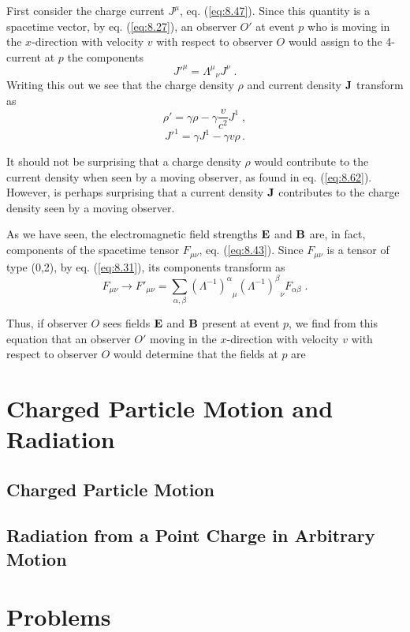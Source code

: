 First consider the charge current $J^\mu$, eq. (\ref{eq:8.47}). Since this quantity is a spacetime vector, by  eq. (\ref{eq:8.27}), an observer $O'$ at event $p$ who is moving in the $x$-direction with velocity $v$ with respect to observer $O$ would assign to the 4-current at $p$ the components
\begin{equation}\label{eq:8.60}
{J'}^\mu = {\Lambda^\mu}_\nu J^\nu\;. 
\end{equation}
Writing this out we see that the charge density $\rho$ and current density $\vb{J}$ transform as
\begin{equation}\label{eq:8.61}
\rho' = \gamma \rho - \gamma \frac{v}{c^2} J^1\;,
\end{equation}
\begin{equation}\label{eq:8.62}
{J'}^1 = \gamma J^1 - \gamma v \rho\,.
\end{equation}

It should not be surprising that a charge density $\rho$ would contribute to the current density when seen by a moving observer, as found in eq. (\ref{eq:8.62}). However, is perhaps surprising that a current density $\vb{J}$ contributes to the charge density seen by a moving observer. 

As we have seen, the electromagnetic field strengths $\vb{E}$ and $\vb{B}$ are, in fact, components of the spacetime tensor $F_{\mu\nu}$, eq. (\ref{eq:8.43}). Since $F_{\mu\nu}$ is a tensor of type (0,2), by eq. (\ref{eq:8.31}), its components transform as
\begin{equation}\label{eq:8.63}
F_{\mu\nu} \rightarrow F'_{\mu\nu} = \sum_{\alpha,\beta} {(\Lambda^{-1})^\alpha}_\mu {(\Lambda^{-1})^\beta}_\nu F_{\alpha\beta}\;. 
\end{equation}

Thus, if observer $O$ sees fields $\vb{E}$ and $\vb{B}$ present at event $p$, we find from this equation that an observer $O'$ moving in the $x$-direction with velocity $v$ with respect to observer $O$ would determine that the fields at $p$ are













\section{Charged Particle Motion and Radiation}\label{sec:8.3}

\subsection{Charged Particle Motion}\label{ssec:8.3.1}

\subsection{Radiation from a Point Charge in Arbitrary Motion}\label{ssec:8.3.2}


\section*{Problems}


